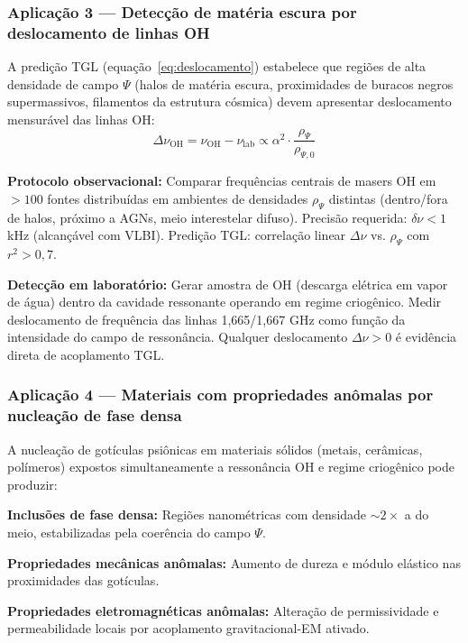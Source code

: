 \documentclass[12pt,a4paper]{article}
\newcommand{\alphaii}{\alpha^2}
\newcommand{\rhoPsi}{\rho_\Psi}
\newcommand{\nuOH}{\nu_{\text{OH}}}
\begin{document}
\subsubsection{Aplicação 3 --- Detecção de matéria escura por
deslocamento de linhas OH}

A predição TGL (equação~\ref{eq:deslocamento}) estabelece que
regiões de alta densidade de campo $\Psi$ (halos de matéria
escura, proximidades de buracos negros supermassivos,
filamentos da estrutura cósmica) devem apresentar
deslocamento mensurável das linhas OH:
\begin{equation}
\Delta\nu_{\text{OH}} = \nuOH - \nu_{\text{lab}}
  \propto \alphaii \cdot \frac{\rhoPsi}{\rho_{\Psi,0}}
\end{equation}

\textbf{Protocolo observacional:} Comparar frequências centrais
de masers OH em $>100$ fontes distribuídas em ambientes de
densidades $\rhoPsi$ distintas (dentro/fora de halos, próximo a
AGNs, meio interestelar difuso). Precisão requerida:
$\delta\nu < 1$ kHz (alcançável com VLBI). Predição TGL:
correlação linear $\Delta\nu$ vs. $\rhoPsi$ com $r^2 > 0{,}7$.

\textbf{Detecção em laboratório:} Gerar amostra de OH
(descarga elétrica em vapor de água) dentro da cavidade
ressonante operando em regime criogênico. Medir deslocamento
de frequência das linhas 1,665/1,667 GHz como função da
intensidade do campo de ressonância. Qualquer deslocamento
$\Delta\nu > 0$ é evidência direta de acoplamento TGL.

\subsubsection{Aplicação 4 --- Materiais com propriedades
anômalas por nucleação de fase densa}

A nucleação de gotículas psiônicas em materiais sólidos
(metais, cerâmicas, polímeros) expostos simultaneamente a
ressonância OH e regime criogênico pode produzir:

\textbf{Inclusões de fase densa:} Regiões nanométricas com
densidade $\sim 2\times$ a do meio, estabilizadas pela
coerência do campo $\Psi$.

\textbf{Propriedades mecânicas anômalas:} Aumento de dureza
e módulo elástico nas proximidades das gotículas.

\textbf{Propriedades eletromagnéticas anômalas:} Alteração
de permissividade e permeabilidade locais por acoplamento
gravitacional-EM ativado.
\end{document}
